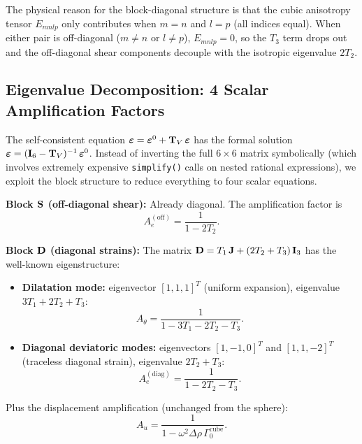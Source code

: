 The physical reason for the block-diagonal structure is that the cubic
anisotropy tensor $E_{mnlp}$ only contributes when $m=n$ and $l=p$ (all
indices equal).  When either pair is off-diagonal ($m\neq n$ or $l\neq p$),
$E_{mnlp}=0$, so the $T_3$ term drops out and the off-diagonal shear
components decouple with the isotropic eigenvalue $2T_2$.

\subsection{Eigenvalue Decomposition: 4 Scalar Amplification Factors}

The self-consistent equation $\boldsymbol{\varepsilon} =
\boldsymbol{\varepsilon}^0 + \mathbf{T}_V\,\boldsymbol{\varepsilon}$ has the
formal solution
$\boldsymbol{\varepsilon} = (\mathbf{I}_6 - \mathbf{T}_V)^{-1}\,\boldsymbol{\varepsilon}^0$.
Instead of inverting the full $6\times 6$ matrix symbolically (which
involves extremely expensive \texttt{simplify()} calls on nested rational
expressions), we exploit the block structure to reduce everything to four
scalar equations.

\textbf{Block $\mathbf{S}$ (off-diagonal shear):}  Already diagonal.  The
amplification factor is
\begin{equation}
  A_e^{(\text{off})} = \frac{1}{1-2T_2}.
\label{eq:Aeoff}
\end{equation}

\textbf{Block $\mathbf{D}$ (diagonal strains):}  The matrix
$\mathbf{D} = T_1\,\mathbf{J} + (2T_2+T_3)\,\mathbf{I}_3$ has the well-known eigenstructure:

\begin{itemize}
\item \textbf{Dilatation mode:}  eigenvector $[1,1,1]^T$ (uniform
  expansion), eigenvalue $3T_1 + 2T_2 + T_3$:
\begin{equation}
  A_\theta = \frac{1}{1-3T_1-2T_2-T_3}.
\label{eq:Athcube}
\end{equation}

\item \textbf{Diagonal deviatoric modes:}  eigenvectors $[1,-1,0]^T$ and
  $[1,1,-2]^T$ (traceless diagonal strain), eigenvalue $2T_2+T_3$:
\begin{equation}
  A_e^{(\text{diag})} = \frac{1}{1-2T_2-T_3}.
\label{eq:Aediag}
\end{equation}
\end{itemize}
Plus the displacement amplification (unchanged from the sphere):
\begin{equation}
  A_u = \frac{1}{1-\omega^2\Delta\rho\,\Gamma_0^{\text{cube}}}.
\label{eq:Aucube}
\end{equation}

